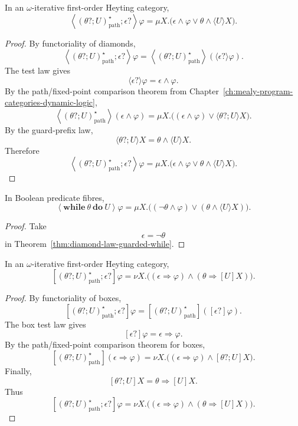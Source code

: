 \begin{theorem}
\label{thm:diamond-law-guarded-while}
In an \(\omega\)-iterative first-order Heyting category,
\[
\left\langle
(\theta?;U)^\star_{\mathrm{path}};\epsilon?
\right\rangle\varphi
=
\mu X.\bigl(\epsilon\wedge\varphi
\vee
\theta\wedge\langle U\rangle X\bigr).
\]
\end{theorem}

\begin{proof}
By functoriality of diamonds,
\[
\left\langle
(\theta?;U)^\star_{\mathrm{path}};\epsilon?
\right\rangle\varphi
=
\left\langle
(\theta?;U)^\star_{\mathrm{path}}
\right\rangle
(\langle \epsilon?\rangle\varphi).
\]
The test law gives
\[
\langle \epsilon?\rangle\varphi
=
\epsilon\wedge\varphi.
\]
By the path/fixed-point comparison theorem from
Chapter~\ref{ch:mealy-program-categories-dynamic-logic},
\[
\left\langle
(\theta?;U)^\star_{\mathrm{path}}
\right\rangle
(\epsilon\wedge\varphi)
=
\mu X.\bigl((\epsilon\wedge\varphi)
\vee
\langle \theta?;U\rangle X\bigr).
\]
By the guard-prefix law,
\[
\langle \theta?;U\rangle X
=
\theta\wedge\langle U\rangle X.
\]
Therefore
\[
\left\langle
(\theta?;U)^\star_{\mathrm{path}};\epsilon?
\right\rangle\varphi
=
\mu X.\bigl(\epsilon\wedge\varphi
\vee
\theta\wedge\langle U\rangle X\bigr).
\]
\end{proof}

\begin{corollary}
\label{cor:boolean-while-law}
In Boolean predicate fibres,
\[
\left\langle
\mathbf{while}\ \theta\ \mathbf{do}\ U
\right\rangle\varphi
=
\mu X.\bigl((\neg\theta\wedge\varphi)
\vee
(\theta\wedge\langle U\rangle X)\bigr).
\]
\end{corollary}

\begin{proof}
Take
\[
\epsilon=\neg\theta
\]
in Theorem~\ref{thm:diamond-law-guarded-while}.
\end{proof}

\begin{theorem}
\label{thm:box-law-guarded-while}
In an \(\omega\)-iterative first-order Heyting category,
\[
\left[
(\theta?;U)^\star_{\mathrm{path}};\epsilon?
\right]\varphi
=
\nu X.\bigl((\epsilon\Rightarrow\varphi)
\wedge
(\theta\Rightarrow[U]X)\bigr).
\]
\end{theorem}

\begin{proof}
By functoriality of boxes,
\[
\left[
(\theta?;U)^\star_{\mathrm{path}};\epsilon?
\right]\varphi
=
\left[
(\theta?;U)^\star_{\mathrm{path}}
\right]
([\epsilon?]\varphi).
\]
The box test law gives
\[
[\epsilon?]\varphi
=
\epsilon\Rightarrow\varphi.
\]
By the path/fixed-point comparison theorem for boxes,
\[
\left[
(\theta?;U)^\star_{\mathrm{path}}
\right]
(\epsilon\Rightarrow\varphi)
=
\nu X.\bigl((\epsilon\Rightarrow\varphi)
\wedge
[\theta?;U]X\bigr).
\]
Finally,
\[
[\theta?;U]X
=
\theta\Rightarrow[U]X.
\]
Thus
\[
\left[
(\theta?;U)^\star_{\mathrm{path}};\epsilon?
\right]\varphi
=
\nu X.\bigl((\epsilon\Rightarrow\varphi)
\wedge
(\theta\Rightarrow[U]X)\bigr).
\]
\end{proof}

